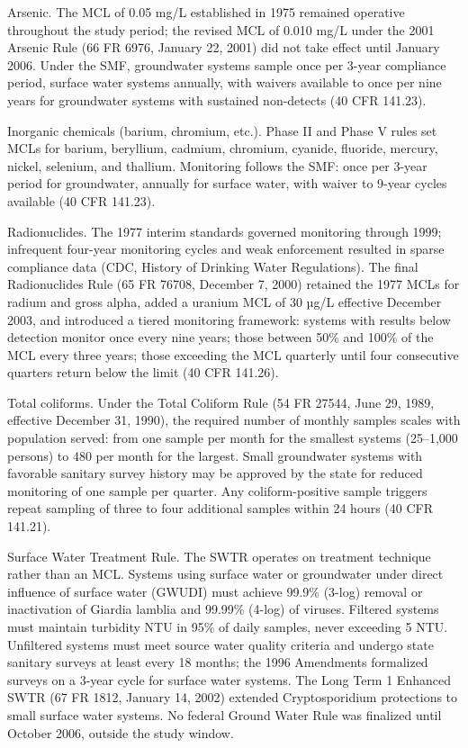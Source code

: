 Arsenic. The MCL of 0.05 mg/L established in 1975 remained operative throughout the study period; the revised MCL of 0.010 mg/L under the 2001 Arsenic Rule (66 FR 6976, January 22, 2001) did not take effect until January 2006. Under the SMF, groundwater systems sample once per 3-year compliance period, surface water systems annually, with waivers available to once per nine years for groundwater systems with sustained non-detects (40 CFR 141.23).

Inorganic chemicals (barium, chromium, etc.). Phase II and Phase V rules set MCLs for barium, beryllium, cadmium, chromium, cyanide, fluoride, mercury, nickel, selenium, and thallium. Monitoring follows the SMF: once per 3-year period for groundwater, annually for surface water, with waiver to 9-year cycles available (40 CFR 141.23).

Radionuclides. The 1977 interim standards governed monitoring through 1999; infrequent four-year monitoring cycles and weak enforcement resulted in sparse compliance data (CDC, History of Drinking Water Regulations). The final Radionuclides Rule (65 FR 76708, December 7, 2000) retained the 1977 MCLs for radium and gross alpha, added a uranium MCL of 30 µg/L effective December 2003, and introduced a tiered monitoring framework: systems with results below detection monitor once every nine years; those between 50\% and 100\% of the MCL every three years; those exceeding the MCL quarterly until four consecutive quarters return below the limit (40 CFR 141.26).

Total coliforms. Under the Total Coliform Rule (54 FR 27544, June 29, 1989, effective December 31, 1990), the required number of monthly samples scales with population served: from one sample per month for the smallest systems (25–1,000 persons) to 480 per month for the largest. Small groundwater systems with favorable sanitary survey history may be approved by the state for reduced monitoring of one sample per quarter. Any coliform-positive sample triggers repeat sampling of three to four additional samples within 24 hours (40 CFR 141.21).

Surface Water Treatment Rule. The SWTR operates on treatment technique rather than an MCL. Systems using surface water or groundwater under direct influence of surface water (GWUDI) must achieve 99.9\% (3-log) removal or inactivation of Giardia lamblia and 99.99\% (4-log) of viruses. Filtered systems must maintain turbidity  NTU in 95\% of daily samples, never exceeding 5 NTU. Unfiltered systems must meet source water quality criteria and undergo state sanitary surveys at least every 18 months; the 1996 Amendments formalized surveys on a 3-year cycle for surface water systems. The Long Term 1 Enhanced SWTR (67 FR 1812, January 14, 2002) extended Cryptosporidium protections to small surface water systems. No federal Ground Water Rule was finalized until October 2006, outside the study window.

